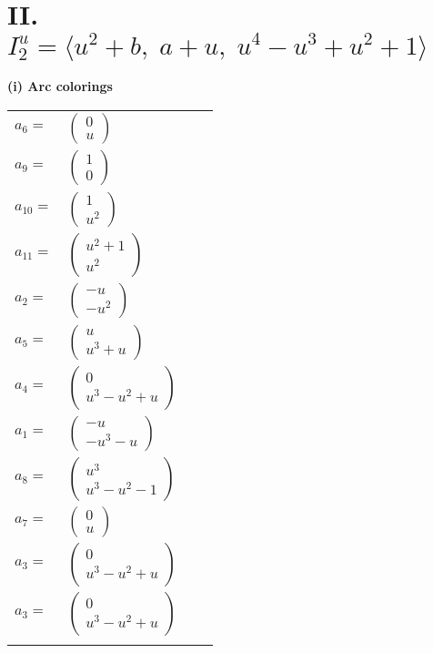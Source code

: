 \documentclass[1p]{elsarticle_modified}
\theoremstyle{definition}
\begin{document}
\centering \section*{II. $I^u_{2}= \langle u^2+b,\;a+u,\;u^4- u^3+u^2+1 \rangle$}
\flushleft \textbf{(i) Arc colorings}\\
\begin{tabular}{m{7pt} m{180pt} m{7pt} m{180pt} }
\flushright $a_{6}=$&$\begin{pmatrix}0\\u\end{pmatrix}$ \\
\flushright $a_{9}=$&$\begin{pmatrix}1\\0\end{pmatrix}$ \\
\flushright $a_{10}=$&$\begin{pmatrix}1\\u^2\end{pmatrix}$ \\
\flushright $a_{11}=$&$\begin{pmatrix}u^2+1\\u^2\end{pmatrix}$ \\
\flushright $a_{2}=$&$\begin{pmatrix}- u\\- u^2\end{pmatrix}$ \\
\flushright $a_{5}=$&$\begin{pmatrix}u\\u^3+u\end{pmatrix}$ \\
\flushright $a_{4}=$&$\begin{pmatrix}0\\u^3- u^2+u\end{pmatrix}$ \\
\flushright $a_{1}=$&$\begin{pmatrix}- u\\- u^3- u\end{pmatrix}$ \\
\flushright $a_{8}=$&$\begin{pmatrix}u^3\\u^3- u^2-1\end{pmatrix}$ \\
\flushright $a_{7}=$&$\begin{pmatrix}0\\u\end{pmatrix}$ \\
\flushright $a_{3}=$&$\begin{pmatrix}0\\u^3- u^2+u\end{pmatrix}$\\ \flushright $a_{3}=$&$\begin{pmatrix}0\\u^3- u^2+u\end{pmatrix}$\\&\end{tabular}
\end{document}
